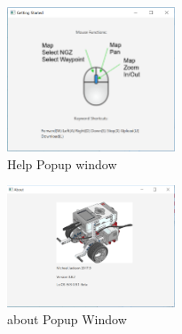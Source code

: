 \begin{itemize}
\begin{figure}[H]
	\includegraphics[width=50mm]{help.PNG}  
	\caption{Help Popup window}
	\label{fig:Help Popup Window}				
\end{figure}

\begin{figure}[H]
	\includegraphics[width=50mm]{about.PNG}  
	\caption{about Popup Window}
	\label{fig:About Popup Window}				
\end{figure}



\end{itemize}


	
